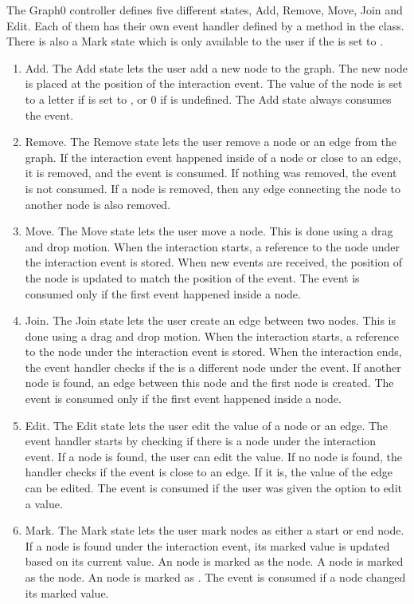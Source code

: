 The Graph0 controller defines five different states, Add, Remove, Move, Join and Edit. Each of them has their own event handler defined by a method in the class. There is also a Mark state which is only available to the user if the  is set to .
\begin{enumerate}
    \item Add. The Add state lets the user add a new node to the graph. The new node is placed at the position of the interaction event. The value of the node is set to a letter if  is set to , or 0 if  is undefined. The Add state always consumes the event. 
    \item Remove. The Remove state lets the user remove a node or an edge from the graph. If the interaction event happened inside of a node or close to an edge, it is removed, and the event is consumed. If nothing was removed, the event is not consumed. If a node is removed, then any edge connecting the node to another node is also removed.
    \item Move. The Move state lets the user move a node. This is done using a drag and drop motion. When the interaction starts, a reference to the node under the interaction event is stored. When new events are received, the position of the node is updated to match the position of the event. The event is consumed only if the first event happened inside a node.
    \item Join. The Join state lets the user create an edge between two nodes. This is done using a drag and drop motion. When the interaction starts, a reference to the node under the interaction event is stored. When the interaction ends, the event handler checks if the is a different node under the event. If another node is found, an edge between this node and the first node is created. The event is consumed only if the first event happened inside a node.
    \item Edit. The Edit state lets the user edit the value of a node or an edge. The event handler starts by checking if there is a node under the interaction event. If a node is found, the user can edit the value. If no node is found, the handler checks if the event is close to an edge. If it is, the value of the edge can be edited. The event is consumed if the user was given the option to edit a value.
    \item Mark. The Mark state lets the user mark nodes as either a start or end node. If a node is found under the interaction event, its marked value is updated based on its current value. An  node is marked as the  node. A  node is marked as the  node. An  node is marked as . The event is consumed if a node changed its marked value.
\end{enumerate}
